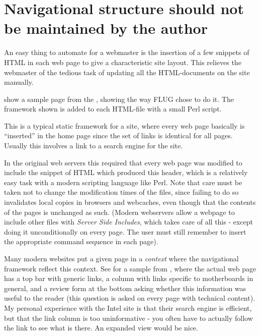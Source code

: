 \section{Navigational structure should not be maintained by the author}


An easy thing to automate for a webmaster is the insertion of a few
snippets of HTML in each web page to give a characteristic site
layout.  This relieves the webmaster of the tedious task of updating
all the HTML-documents on the site manually.

 show a sample page from the
,
showing the way FLUG chose to do it.  The framework shown is added to
each HTML-file with a small Perl script.

This is a typical static framework for a site, where every web page
basically is ``inserted'' in the home page since the set of links is
identical for all pages.  Usually this involves a link to a search
engine for the site.

In the original web servers this required that every web page was
modified to include the snippet of HTML which produced this header,
which is a relatively easy task with a modern scripting language like
Perl.  Note that care must be taken not to change the modification
times of the files, since failing to do so invalidates local copies in
browsers and webcaches, even though that the contents of the pages is
unchanged as such.  (Modern webservers allow a webpage to include
other files with
%
{\textit{Server Side Includes}}, which takes care of all this - except
doing it unconditionally on every page.  The user must still remember
to insert the appropriate command sequence in each page).

%
%
Many modern websites put a given page in a \textit{context} where the
navigational framework reflect this context.  See
 for a sample from
, where the actual web page has a
top bar with generic links, a column with links specific to
motherboards in general, and a review form at the bottom asking
whether this information was useful to the reader (this question is
asked on every page with technical content).  My personal experience
with the Intel site is that their search engine is efficient, but that
the link column is too uninformative - you often have to actually
follow the link to see what is there.  An expanded view would be nice.

